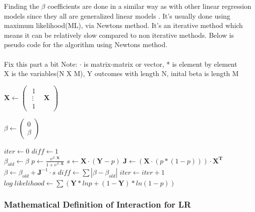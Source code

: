 \documentclass[10pt,a4paper]{report}
\begin{document}
Finding the $\beta$ coefficients are done in a similar way as with other linear regression models since they all are generalized linear models \cite{agresti_categorical}. It's usually done using  maximum likelihood(ML), via Newtons method\cite{agresti_categorical, uvehag_master_thesis}. It's an iterative method which means it can be relatively slow compared to non iterative methods. Below is pseudo code for the algorithm using Newtons method\cite{uvehag_master_thesis}.\\
\\
Fix this part a bit %
Note: $\cdot$ is matrix-matrix or vector, * is element by element\\
X is the variables(N X M), Y outcomes with length N, inital beta is length M

\begin{algorithm}
\begin{algorithmic}
\State $\boldsymbol{X}\gets
\begin{pmatrix}
\begin{matrix}
  1\\
  \vdots\\
  1
\end{matrix} & \boldsymbol{X}
\end{pmatrix}
$

\State $\beta\gets
\begin{pmatrix}
  0\\
  \beta
\end{pmatrix}
$

\State $iter\gets 0$
\State $diff\gets 1$
\\
\State $\beta_{old}\gets\beta$
\State $p\gets \frac{e^{\beta \cdot \boldsymbol{X}}}{1+e^{\beta \cdot \boldsymbol{X}}}$
\State $s\gets \boldsymbol{X}\cdot (\boldsymbol{Y}-p)$
\State $\boldsymbol{J}\gets (\boldsymbol{X}\cdot (p*(1-p)))\cdot \boldsymbol{X^T}$
\State $\beta\gets \beta_{old}+\boldsymbol{J}^{-1} \cdot s$
\State $diff\gets \sum |\beta-\beta_{old}|$
\State $iter\gets iter+1$
\EndWhile
\State $log \; likelihood\gets \sum (\boldsymbol{Y}*ln p+(1-\boldsymbol{Y})*ln(1-p))$
\end{algorithmic}
\end{algorithm}

\subsubsection{Mathematical Definition of Interaction for LR}
\label{additive}
\end{document}
